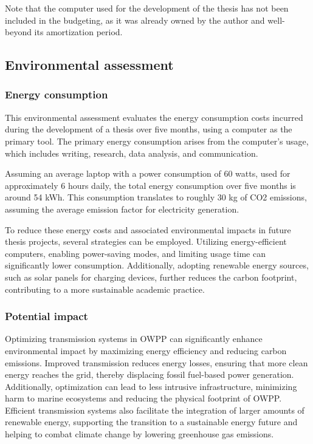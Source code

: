 \documentclass[a4paper,11pt, titlepage, twoside]{article}
\begin{document}
Note that the computer used for the development of the thesis has not been included in the budgeting, as it was already owned by the author and well-beyond its amortization period.

\subsection{Environmental assessment}

\subsubsection{Energy consumption}

This environmental assessment evaluates the energy consumption costs incurred during
the development of a thesis over five months, using a computer as the primary tool. The primary energy consumption arises
from the computer's usage, which includes writing, research, data analysis, and communication.\par

Assuming an average laptop with a power consumption of 60 watts, used for approximately 6 hours daily, the total energy consumption
over five months is around 54 kWh. This consumption translates to roughly 30 kg of CO2 emissions, assuming the average emission
factor for electricity generation.\par

To reduce these energy costs and associated environmental impacts in future thesis projects, several strategies can be employed.
Utilizing energy-efficient computers, enabling power-saving modes, and limiting usage time can significantly lower consumption.
Additionally, adopting renewable energy sources, such as solar panels for charging devices, further reduces the carbon footprint,
contributing to a more sustainable academic practice.

\subsubsection{Potential impact}

Optimizing transmission systems in OWPP can significantly enhance environmental impact by maximizing energy efficiency
and reducing carbon emissions. Improved transmission reduces energy losses, ensuring that more clean energy reaches the grid, thereby displacing fossil
fuel-based power generation. Additionally, optimization can lead to less intrusive infrastructure, minimizing harm to marine ecosystems and reducing the physical footprint of OWPP.
Efficient transmission systems also facilitate the integration of larger amounts of renewable energy, supporting the transition to a sustainable energy future and helping to combat climate change by lowering
greenhouse gas emissions.
\end{document}
